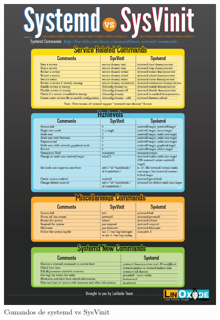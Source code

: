 \begin{figure}[H] 
\centering
\includegraphics[scale=0.75]{./imagenes/systemd_sysVinit.png} 
\caption{Comandos de systemd vs SysVinit} \label{fig:systemd_sysVinit}
\end{figure}







